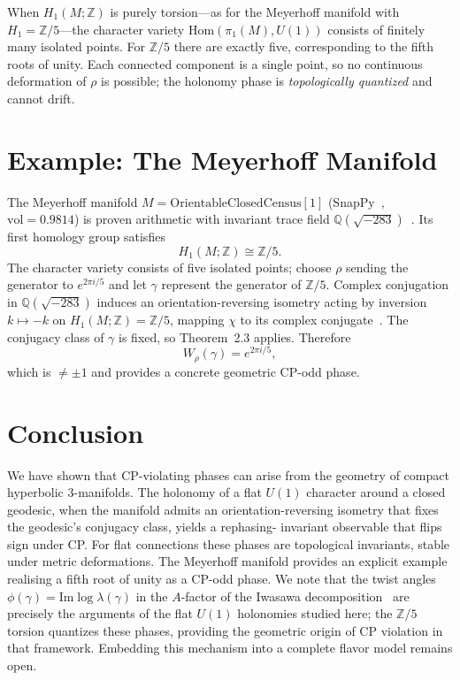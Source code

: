 \documentclass[12pt]{article}
\begin{document}
\begin{remark}
When $H_1(M;\mathbb{Z})$ is purely torsion---as for the Meyerhoff
manifold with $H_1=\mathbb{Z}/5$---the character variety
$\mathrm{Hom}(\pi_1(M),U(1))$ consists of finitely many isolated points.
For $\mathbb{Z}/5$ there are exactly five, corresponding to the fifth
roots of unity.  Each connected component is a single point, so no
continuous deformation of $\rho$ is possible; the holonomy phase is
\emph{topologically quantized} and cannot drift.
\end{remark}

\section{Example: The Meyerhoff Manifold}

The Meyerhoff manifold $M=\mathrm{OrientableClosedCensus}[1]$
(SnapPy~\cite{SnapPy}, $\mathrm{vol}=0.9814$) is proven arithmetic
with invariant trace field $\mathbb{Q}(\sqrt{-283})$~\cite{Chinburg98}.
Its first homology group satisfies
\[
H_1(M;\mathbb{Z}) \cong \mathbb{Z}/5.
\]
The character variety consists of five isolated points; choose $\rho$
sending the generator to $e^{2\pi i/5}$ and let $\gamma$ represent the
generator of $\mathbb{Z}/5$.
Complex conjugation in $\mathbb{Q}(\sqrt{-283})$ induces an
orientation-reversing isometry acting by inversion
$k\mapsto -k$ on $H_1(M;\mathbb{Z})=\mathbb{Z}/5$,
mapping $\chi$ to its complex conjugate~\cite{MaclachlanReid,Chinburg98}.
The conjugacy class of $\gamma$ is fixed, so Theorem~2.3 applies.
Therefore
\[
W_\rho(\gamma) = e^{2\pi i/5},
\]
which is $\neq \pm 1$ and provides a concrete geometric CP-odd phase.

\section{Conclusion}

We have shown that CP-violating phases can arise from the geometry of
compact hyperbolic $3$-manifolds.  The holonomy of a flat $U(1)$ character
around a closed geodesic, when the manifold admits an orientation-reversing
isometry that fixes the geodesic’s conjugacy class, yields a rephasing-
invariant observable that flips sign under CP.  For flat connections these
phases are topological invariants, stable under metric deformations.
The Meyerhoff manifold provides an explicit example realising a fifth
root of unity as a CP-odd phase.
We note that the twist angles $\phi(\gamma)=\mathrm{Im}\log\lambda(\gamma)$
in the $A$-factor of the Iwasawa decomposition~\cite{Gentry:CKM,Gentry:PMNS}
are precisely the arguments of the flat $U(1)$ holonomies studied here;
the $\mathbb{Z}/5$ torsion quantizes these phases, providing the geometric
origin of CP violation in that framework.
Embedding this mechanism into a complete flavor model remains open.
\end{document}
